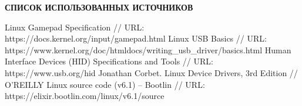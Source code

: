 \begin{center}
	{\bfseries\large СПИСОК ИСПОЛЬЗОВАННЫХ ИСТОЧНИКОВ}
\end{center}

\begingroup
\renewcommand{\section}[2]{}
\begin{thebibliography}{}
	 Linux Gamepad Specification // URL: https://docs.kernel.org/input/gamepad.html
	 Linux USB Basics // URL: https://www.kernel.org/doc/htmldocs/writing\_usb\_driver/basics.html
	 Human Interface Devices (HID) Specifications and Tools // URL: https://www.usb.org/hid
	 Jonathan Corbet. Linux Device Drivers, 3rd Edition // O'REILLY
	 Linux source code (v6.1) -- Bootlin // URL: https://elixir.bootlin.com/linux/v6.1/source
\end{thebibliography}
\endgroup

\pagebreak
